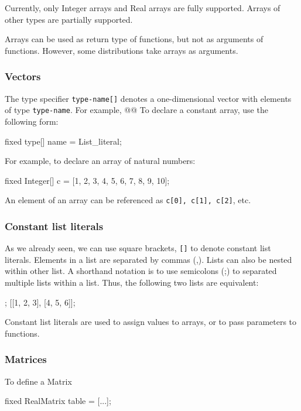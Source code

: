 \documentclass[12pt]{article}
\begin{document}
Currently, only Integer arrays and Real arrays are fully
supported. Arrays of other types are partially supported. 


Arrays can be used as return type of functions, but not as arguments of functions. However, some distributions take arrays as arguments.

\subsubsection{Vectors}\label{vector-section}


The \bl type specifier \verb|type-name[]| denotes
a one-dimensional vector with elements of type {\tt type-name}.
For example, @@
To declare a constant array, use the following form:
\begin{blogcode}
fixed type[] name = List_literal;
\end{blogcode}

For example, to declare an array of natural numbers:
\begin{blogcode}
fixed Integer[] c = [1, 2, 3, 4, 5, 6, 7, 8, 9, 10];
\end{blogcode}

An element of an array can be referenced as \verb|c[0], c[1], c[2]|, etc.

\subsubsection{Constant list literals}\label{list-literal-section}
As we already seen, we can use square brackets, \texttt{[]} to denote constant list literals.
Elements in a list are separated by commas (,). Lists can also be nested within other list. A shorthand notation is to use semicolons (;) to separated multiple lists within a list.
Thus, the following two lists are equivalent:
\begin{blogcode}
[1, 2, 3; 4, 5, 6];
[[1, 2, 3], [4, 5, 6]];
\end{blogcode}

Constant list literals are used to assign values to arrays, or to pass parameters to functions.

\subsubsection{Matrices}\label{matrix-section}
To define a Matrix
\begin{blogcode}
fixed RealMatrix table = [...];
\end{blogcode}
\end{document}
